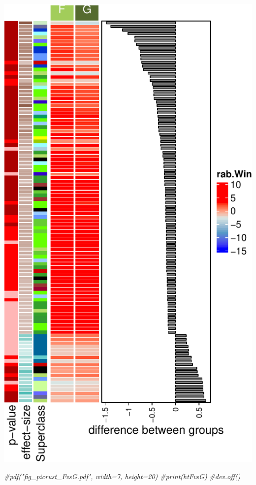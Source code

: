 \documentclass[]{interact}
\theoremstyle{plain}%
\theoremstyle{definition}
\theoremstyle{remark}
\newenvironment{Shaded}{\begin{snugshade}}{\end{snugshade}}
\newcommand{\CommentTok}[1]{\textcolor[rgb]{0.56,0.35,0.01}{\textit{#1}}}
\begin{document}
\begin{center}\includegraphics{Doc_pdf_files/figure-latex/unnamed-chunk-45-1} \end{center}

\begin{Shaded}
\begin{Highlighting}[]
\CommentTok{\#pdf("fig\_picrust\_FvsG.pdf", width=7, height=20)}
\CommentTok{\#print(htFvsG)}
\CommentTok{\#dev.off()}
\end{Highlighting}
\end{Shaded}
\end{document}
